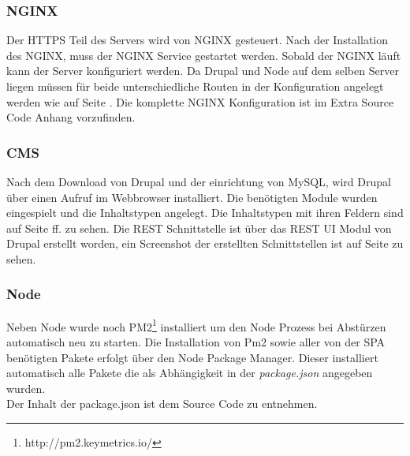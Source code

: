 \documentclass[11pt,a4paper]{article}
\begin{document}
\subsubsection{NGINX}
Der HTTPS Teil des Servers wird von NGINX gesteuert. Nach der Installation des NGINX, muss der NGINX Service gestartet werden. Sobald der NGINX läuft kann der Server konfiguriert werden. Da Drupal und Node auf dem selben Server liegen müssen für beide unterschiedliche Routen in der Konfiguration angelegt werden wie auf Seite \pageref{sec:nginx}. Die komplette NGINX Konfiguration ist im Extra Source Code Anhang vorzufinden.
\subsubsection{CMS}
Nach dem Download von Drupal und der einrichtung von MySQL, wird Drupal über einen Aufruf im Webbrowser installiert. Die benötigten Module wurden eingespielt und die Inhaltstypen angelegt.
Die Inhaltstypen mit ihren Feldern sind auf Seite \pageref{sec:content} ff. zu sehen.
Die REST Schnittstelle ist über das REST UI Modul von Drupal erstellt worden, ein Screenshot der erstellten Schnittstellen ist auf Seite \pageref{sec:rest} zu sehen.
\subsubsection{Node}
Neben Node wurde noch PM2\footnote{http://pm2.keymetrics.io/} installiert um den Node Prozess bei Abstürzen automatisch neu zu starten. Die Installation von Pm2 sowie aller von der SPA benötigten Pakete erfolgt über den Node Package Manager. Dieser installiert automatisch alle Pakete die als Abhängigkeit  in der \textit{package.json} angegeben wurden.\\ Der Inhalt der package.json ist dem Source Code zu entnehmen.
\end{document}
